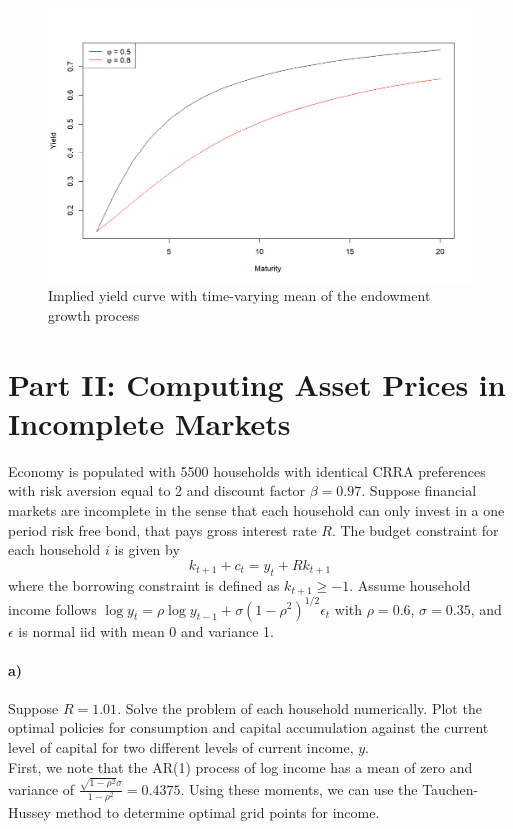 \documentclass[12pt,letter]{article}
\begin{document}
\begin{figure}[H]
	\centering
	\includegraphics[trim={0 0 0 1.5cm},clip,width=\textwidth]{I_1d_YieldCurve}
	\caption{Implied yield curve with time-varying mean of the endowment growth process}
	\label{Figure I.1d}
\end{figure}
\section*{Part II: Computing Asset Prices in Incomplete Markets}
Economy is populated with 5500 households with identical CRRA preferences with risk aversion equal to 2 and discount factor $\beta = 0.97$. Suppose financial markets are incomplete in the sense that each household can only invest in a one period risk free bond, that pays gross interest rate $R$. The budget constraint for each household $i$ is given by 
\begin{equation*}
	k_{t+1} + c_t = y_t + Rk_{t+1}
\end{equation*}
where the borrowing constraint is defined as $k_{t+1}\geq-1$. Assume household income follows $\log y_t = \rho \log y_{t-1} + \sigma(1-\rho^2)^{1/2}\epsilon_t$ with $\rho =0.6$, $\sigma = 0.35$, and $\epsilon$ is normal iid with mean 0 and variance 1. 
\paragraph{a)} Suppose $R=1.01$. Solve the problem of each household numerically. Plot the optimal policies for consumption and capital accumulation against the current level of capital for two different levels of current income, $y$. \\

First, we note that the AR(1) process of log income has a mean of zero and variance of $\frac{\sqrt{1-\rho ^2} \sigma }{1-\rho ^2} = 0.4375$. Using these moments, we can use the Tauchen-Hussey method to determine optimal grid points for income. \\
\end{document}
